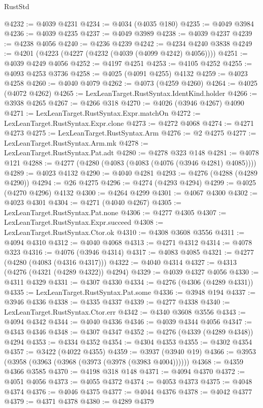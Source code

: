 \begin{lexlean}{RustStd}
\begin{coremodule}
@4232 := @4039 @4231
@4234 := @4034 (@4035 @180)
@4235 := @4049 @3984
@4236 := @4039 @4235
@4237 := @4049 @3989
@4238 := @4039 @4237
@4239 := @4238 @4056
@4240 := @4236 @4239
@4242 := @4234 @4240 @3838
@4249 := @4201 (@4223 (@4227 (@4232 (@4039 (@4099 @4242) @4056))))
@4251 := @4039 @4249 @4056
@4252 := @4197 @4251
@4253 := @4105 @4252
@4255 := @4093 @4253 @3736
@4258 := @4025 (@4091 @4255) @4132
@4259 := @4023 @4258
@4260 := @4040 @4079
@4262 := @4073 (@4259 @4260)
@4264 := @4025 (@4072 @4262)
@4265 := LexLeanTarget.RustSyntax.IdentKind.holder
@4266 := @3938 @4265
@4267 := @4266 @318
@4270 := @4026 (@3946 @4267) @4090
@4271 := LexLeanTarget.RustSyntax.Expr.matchOn
@4272 := LexLeanTarget.RustSyntax.Expr.clone
@4273 := @4272 @4068
@4274 := @4271 @4273
@4275 := LexLeanTarget.RustSyntax.Arm
@4276 := @2 @4275
@4277 := LexLeanTarget.RustSyntax.Arm.mk
@4278 := LexLeanTarget.RustSyntax.Pat.adt
@4280 := @4278 @323 @148
@4281 := @4078 @121
@4288 := @4277 (@4280 (@4083 (@4083 (@4076 (@3946 @4281) @4085))))
@4289 := @4023 @4132
@4290 := @4040 @4281
@4293 := @4276 (@4288 (@4289 @4290))
@4294 := @26 @4275
@4296 := @4274 (@4293 @4294)
@4299 := @4025 (@4270 @4296) @4132
@4300 := @4264 @4299
@4301 := @4067 @4300
@4302 := @4023 @4301
@4304 := @4271 (@4040 @4267)
@4305 := LexLeanTarget.RustSyntax.Pat.none
@4306 := @4277 @4305
@4307 := LexLeanTarget.RustSyntax.Expr.succeed
@4308 := LexLeanTarget.RustSyntax.Ctor.ok
@4310 := @4308 @3608 @3556
@4311 := @4094 @4310
@4312 := @4040 @4068
@4313 := @4271 @4312
@4314 := @4078 @323
@4316 := @4076 (@3946 @4314)
@4317 := @4083 @4085
@4321 := @4277 (@4280 (@4083 (@4316 @4317)))
@4322 := @4040 @4314
@4327 := @4313 (@4276 (@4321 (@4289 @4322)) @4294)
@4329 := @4039 @4327 @4056
@4330 := @4311 @4329
@4331 := @4307 @4330
@4334 := @4276 (@4306 (@4289 @4331))
@4335 := LexLeanTarget.RustSyntax.Pat.some
@4336 := @3948 @194
@4337 := @3946 @4336
@4338 := @4335 @4337
@4339 := @4277 @4338
@4340 := LexLeanTarget.RustSyntax.Ctor.err
@4342 := @4340 @3608 @3556
@4343 := @4094 @4342
@4344 := @4040 @4336
@4346 := @4039 @4344 @4056
@4347 := @4343 @4346
@4348 := @4307 @4347
@4352 := @4276 (@4339 (@4289 @4348)) @4294
@4353 := @4334 @4352
@4354 := @4304 @4353
@4355 := @4302 @4354
@4357 := @3422 (@4022 @4355)
@4359 := @3937 (@3940 @19)
@4366 := @3953 (@3958 (@3963 (@3968 (@3973 (@3978 (@3983 @4004))))))
@4368 := @4359 @4366 @3585
@4370 := @4198 @318 @148
@4371 := @4094 @4370
@4372 := @4051 @4056
@4373 := @4055 @4372
@4374 := @4053 @4373
@4375 := @4048 @4374
@4376 := @4046 @4375
@4377 := @4044 @4376
@4378 := @4042 @4377
@4379 := @4371 @4378
@4380 := @4289 @4379

\end{coremodule}
\end{lexlean}
